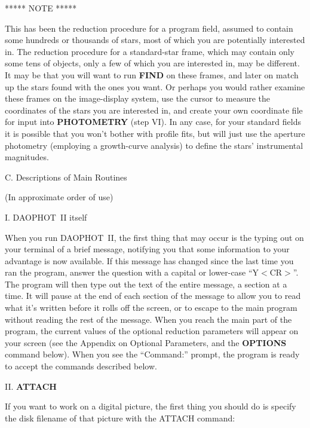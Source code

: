 \bigskip
\medskip 
\centerline{***** NOTE *****}

This has been the reduction procedure for a program field, assumed
to contain some hundreds or thousands of stars, most of which you are
potentially interested in.  The reduction procedure for a standard-star
frame, which may contain only some tens of objects, only a few of which
you are interested in, may be different.  It may be that you will want
to run {\bf FIND} on these frames, and later on match up the stars
found with the ones you want.  Or perhaps you would rather examine
these frames on the image-display system, use the cursor to measure the
coordinates of the stars you are interested in, and create your own
coordinate file for input into {\bf PHOTOMETRY} (step VI).  In any
case, for your standard fields it is possible that you won't bother
with profile fits, but will just use the aperture photometry (employing
a growth-curve analysis) to define the stars' instrumental magnitudes. 

\vfill
\eject
\centerline{C.  Descriptions of Main Routines}
\centerline{(In approximate order of use)} 
\noindent I.  DAOPHOT~II itself

When you run DAOPHOT~II, the first thing that may occur is the typing
out on your terminal of a brief message, notifying you that some
information to your advantage is now available.  If this message has
changed since the last time you ran the program, answer the question
with a capital or lower-case ``Y$<$CR$>$''.  The program will then type
out the text of the entire message, a section at a time.  It will pause
at the end of each section of the message to allow you to read what
it's written before it rolls off the screen, or to escape to the main
program without reading the rest of the message.  When you reach the
main part of the program, the current values of the optional reduction
parameters will appear on your screen (see the Appendix on Optional
Parameters, and the {\bf OPTIONS} command below).  When you see the
``Command:'' prompt, the program is ready to accept the commands
described below. 

\vfill
\eject
\noindent II.  {\bf ATTACH}

     If you want to work on a digital picture, the first thing you
should do is specify the disk filename of that picture with the ATTACH
command: 

